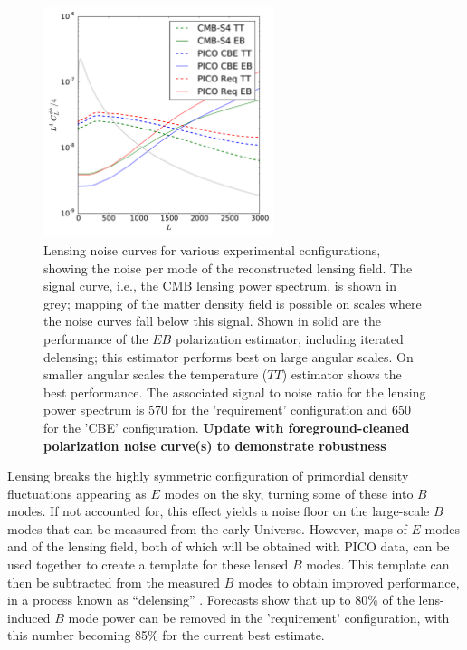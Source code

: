 \documentclass[PICOReport.tex]{subfiles}
\begin{document}
\begin{figure}
\begin{center}
\includegraphics[width=0.6\textwidth]{images/lensingNoisePICO.pdf}
\end{center}
\caption{\label{fig:lensingNoisePICO} Lensing noise curves for various experimental configurations, showing the noise per mode of the reconstructed lensing field.  The signal curve, i.e., the CMB lensing power spectrum, is shown in grey; mapping of the matter density field is possible on scales where the noise curves fall below this signal.  Shown in solid are the performance of the $EB$ polarization estimator, including iterated delensing; this estimator performs best on large angular scales.  On smaller angular scales the temperature ($TT$) estimator shows the best performance. The associated signal to noise ratio for the lensing power spectrum is 570 for the 'requirement' configuration and 650 for the 'CBE' configuration. \textbf{Update with foreground-cleaned polarization noise curve(s) to demonstrate robustness}}
\end{figure}

Lensing breaks the highly symmetric configuration of primordial density fluctuations appearing as $E$ modes on the sky, turning some of these into $B$ modes.  If not accounted for, this effect yields a noise floor on the large-scale $B$ modes that can be measured from the early Universe.  However, maps of $E$ modes and of the lensing field, both of which will be obtained with PICO data, can be used together to create a template for these lensed $B$ modes.  This template can then be subtracted from the measured $B$ modes to obtain improved performance, in a process known as ``delensing'' \citep{2004PhRvD..69d3005S,2012JCAP...06..014S}.  Forecasts show that up to 80\% of the lens-induced $B$ mode power can be removed in the 'requirement' configuration, with this number becoming 85\% for the current best estimate.  
\end{document}
